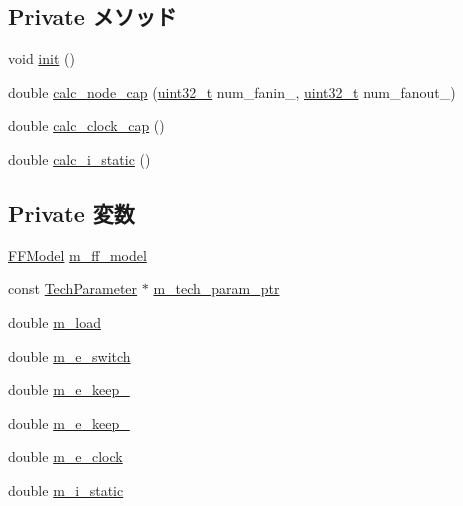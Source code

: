 \subsection*{Private メソッド}
\begin{DoxyCompactItemize}
\item 
void \hyperlink{classFlipFlop_a02fd73d861ef2e4aabb38c0c9ff82947}{init} ()
\item 
double \hyperlink{classFlipFlop_a8eb4bf711fb28f21b466671a275d84a7}{calc\_\-node\_\-cap} (\hyperlink{Type_8hh_a435d1572bf3f880d55459d9805097f62}{uint32\_\-t} num\_\-fanin\_\-, \hyperlink{Type_8hh_a435d1572bf3f880d55459d9805097f62}{uint32\_\-t} num\_\-fanout\_\-)
\item 
double \hyperlink{classFlipFlop_a379c4230af4ae12ec9291245a2254ea9}{calc\_\-clock\_\-cap} ()
\item 
double \hyperlink{classFlipFlop_a0027807356ac4ca07fe2e593234eb884}{calc\_\-i\_\-static} ()
\end{DoxyCompactItemize}
\subsection*{Private 変数}
\begin{DoxyCompactItemize}
\item 
\hyperlink{classFlipFlop_a56818e5d3e33fce7656b2034c4456fa1}{FFModel} \hyperlink{classFlipFlop_ae11ee233b7ee30f8d01fb91933cda856}{m\_\-ff\_\-model}
\item 
const \hyperlink{classTechParameter}{TechParameter} $\ast$ \hyperlink{classFlipFlop_a11d1644aa2bfe0e16783dface6fadf13}{m\_\-tech\_\-param\_\-ptr}
\item 
double \hyperlink{classFlipFlop_a495601dc4e702bab2bfd4ac968bfbb5c}{m\_\-load}
\item 
double \hyperlink{classFlipFlop_a7ce8ef1ca298dcacf23bf88066e5eb5d}{m\_\-e\_\-switch}
\item 
double \hyperlink{classFlipFlop_a2bad7eccf5a915c14757105ebdf0918b}{m\_\-e\_\-keep\_}
\item 
double \hyperlink{classFlipFlop_adc71b434b818023684c246ddfda8d233}{m\_\-e\_\-keep\_}
\item 
double \hyperlink{classFlipFlop_aa792236c7c5c8ec932eb85e66a201197}{m\_\-e\_\-clock}
\item 
double \hyperlink{classFlipFlop_a16f0c9e5942378eab4d83da3c61aba7f}{m\_\-i\_\-static}
\end{DoxyCompactItemize}


